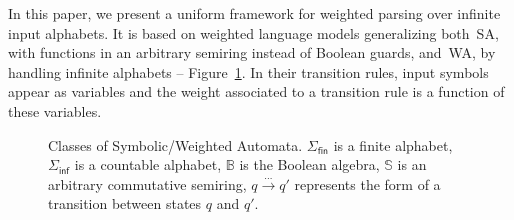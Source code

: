 \documentclass[runningheads]{llncs}
\def\SA{\textsf{SA}\xspace}
\def\WA{\textsf{WA}\xspace}
\begin{document}
In this paper, we present a uniform framework for weighted parsing over infinite input alphabets.
It is based on weighted %
language models generalizing 
both~\SA, with functions in an arbitrary semiring instead of Boolean guards, 
and~\WA, by handling infinite alphabets -- Figure~\ref{fig:hierarchy}.
In their transition rules, input symbols appear as variables %
and the weight associated to a transition rule is a function of these variables.
%
\begin{figure}
\centering
{}
\caption{Classes of Symbolic/Weighted Automata. 
$\Sigma_\mathsf{fin}$ is a finite alphabet, 
$\Sigma_\mathsf{inf}$ is a countable alphabet,
$\mathbb{B}$ is the Boolean algebra, 
$\mathbb{S}$ is an arbitrary commutative semiring, 
$q \xrightarrow{\dots} q'$ represents the form of a transition between states $q$ and $q'$.}
\label{fig:hierarchy}  
\end{figure}
\end{document}
